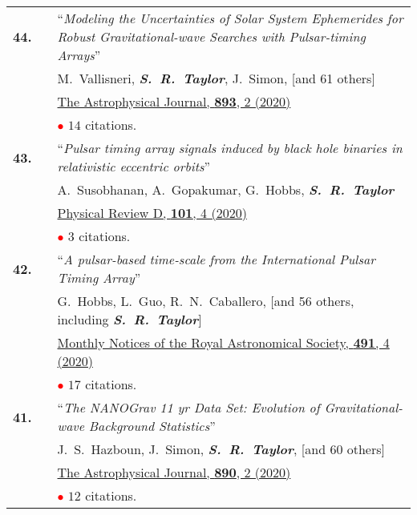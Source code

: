 \documentclass[11pt,letterpaper,sans]{moderncv}
\begin{document}
{\begin{longtable}{rp{0.3cm}p{15.8cm}}
\textbf{44.} & & ``\textit{Modeling the Uncertainties of Solar System Ephemerides for Robust Gravitational-wave Searches with Pulsar-timing Arrays}'' \\ 
&&M.~Vallisneri, \textit{\textbf{S.~R.~Taylor}}, J.~Simon, [and 61 others] \\
&& \href{https://ui.adsabs.harvard.edu/link_gateway/2020ApJ...893..112V/PUB_HTML}{{\color{color1} The Astrophysical Journal, \textbf{893}, 2 (2020)}} \\
&& \textcolor{red}{$\bullet$} $14$ citations. \vspace{0.09cm}\\
\textbf{43.} & & ``\textit{Pulsar timing array signals induced by black hole binaries in relativistic eccentric orbits}'' \\ 
&&A.~Susobhanan, A.~Gopakumar, G.~Hobbs, \textit{\textbf{S.~R.~Taylor}}\\
&& \href{https://ui.adsabs.harvard.edu/link_gateway/2020PhRvD.101d3022S/PUB_HTML}{{\color{color1} Physical Review D, \textbf{101}, 4 (2020)}} \\
&& \textcolor{red}{$\bullet$} $3$ citations. \vspace{0.09cm}\\
\textbf{42.} & & ``\textit{A pulsar-based time-scale from the International Pulsar Timing Array}'' \\ 
&&G.~Hobbs, L.~Guo, R.~N.~Caballero, [and 56 others, including \textit{\textbf{S.~R.~Taylor}}] \\
&& \href{https://ui.adsabs.harvard.edu/link_gateway/2020MNRAS.491.5951H/PUB_HTML}{{\color{color1} Monthly Notices of the Royal Astronomical Society, \textbf{491}, 4 (2020)}} \\
&& \textcolor{red}{$\bullet$} $17$ citations. \vspace{0.09cm}\\
\textbf{41.} & & ``\textit{The NANOGrav 11 yr Data Set: Evolution of Gravitational-wave Background Statistics}'' \\ 
&&J.~S.~Hazboun, J.~Simon, \textit{\textbf{S.~R.~Taylor}}, [and 60 others] \\
&& \href{https://ui.adsabs.harvard.edu/link_gateway/2020ApJ...890..108H/PUB_HTML}{{\color{color1} The Astrophysical Journal, \textbf{890}, 2 (2020)}} \\
&& \textcolor{red}{$\bullet$} $12$ citations. \vspace{0.09cm}\\

\end{longtable}}
\end{document}
